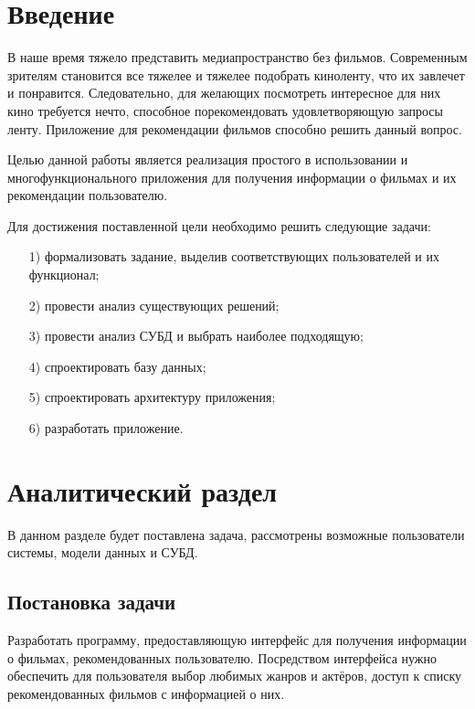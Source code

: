 
\usepackage{enumitem}
\usepackage{kosrem}
\usepackage{gensymb}






\setcounter{page}{3}

\clearpage
\tableofcontents

\clearpage
\section*{Введение}
В наше время тяжело представить медиапространство без фильмов. Современным зрителям становится все тяжелее и тяжелее подобрать киноленту, что их завлечет и понравится. Следовательно, для желающих посмотреть интересное для них кино требуется нечто, способное порекомендовать удовлетворяющую запросы ленту. Приложение для рекомендации фильмов способно решить данный вопрос.
   
Целью данной работы является реализация простого в использовании и многофункционального приложения для получения информации о фильмах и их рекомендации пользователю.

Для достижения поставленной цели необходимо решить следующие задачи:
\begin{itemize}
	\item[1)] формализовать задание, выделив соответствующих пользователей и их функционал;
	\item[2)] провести анализ существующих решений;
	\item[3)] провести анализ СУБД и выбрать наиболее подходящую;
	\item[4)] спроектировать базу данных;
	\item[5)] спроектировать архитектуру приложения;
	\item[6)] разработать приложение.
\end{itemize}

\clearpage
\section{Аналитический раздел}
В данном разделе будет поставлена задача, рассмотрены возможные пользователи системы, модели данных и СУБД.

\subsection{Постановка задачи}
Разработать программу, предоставляющую интерфейс для получения информации о фильмах, рекомендованных пользователю.  Посредством интерфейса нужно обеспечить для пользователя выбор любимых жанров и актёров, доступ к списку рекомендованных фильмов с информацией о них.

